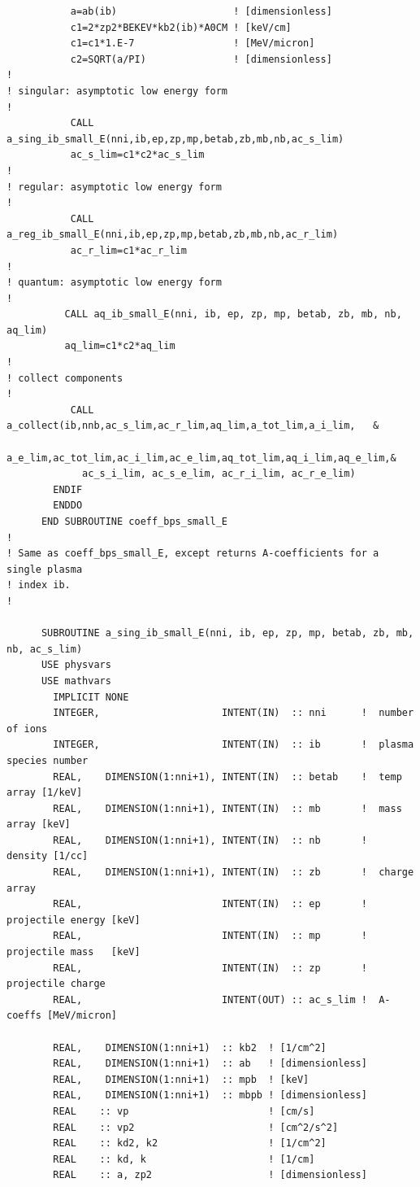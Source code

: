 \documentclass[preprint,12pt,eqsecnum,nofootinbib,amsmath,amssymb]{revtex4}
\begin{document}
{\begin{verbatim}
           a=ab(ib)                    ! [dimensionless] 
           c1=2*zp2*BEKEV*kb2(ib)*A0CM ! [keV/cm]
           c1=c1*1.E-7                 ! [MeV/micron]
           c2=SQRT(a/PI)               ! [dimensionless] 
!
! singular: asymptotic low energy form
!
           CALL a_sing_ib_small_E(nni,ib,ep,zp,mp,betab,zb,mb,nb,ac_s_lim)
           ac_s_lim=c1*c2*ac_s_lim
!
! regular: asymptotic low energy form
!
           CALL a_reg_ib_small_E(nni,ib,ep,zp,mp,betab,zb,mb,nb,ac_r_lim)
           ac_r_lim=c1*ac_r_lim
!
! quantum: asymptotic low energy form
!
          CALL aq_ib_small_E(nni, ib, ep, zp, mp, betab, zb, mb, nb, aq_lim)
          aq_lim=c1*c2*aq_lim
!
! collect components
!
           CALL a_collect(ib,nnb,ac_s_lim,ac_r_lim,aq_lim,a_tot_lim,a_i_lim,   &
             a_e_lim,ac_tot_lim,ac_i_lim,ac_e_lim,aq_tot_lim,aq_i_lim,aq_e_lim,&
             ac_s_i_lim, ac_s_e_lim, ac_r_i_lim, ac_r_e_lim)
        ENDIF
        ENDDO
      END SUBROUTINE coeff_bps_small_E
!
! Same as coeff_bps_small_E, except returns A-coefficients for a single plasma 
! index ib.
!

      SUBROUTINE a_sing_ib_small_E(nni, ib, ep, zp, mp, betab, zb, mb, nb, ac_s_lim)
      USE physvars
      USE mathvars      
        IMPLICIT NONE
        INTEGER,                     INTENT(IN)  :: nni      !  number of ions
        INTEGER,                     INTENT(IN)  :: ib       !  plasma species number
        REAL,    DIMENSION(1:nni+1), INTENT(IN)  :: betab    !  temp array [1/keV]
        REAL,    DIMENSION(1:nni+1), INTENT(IN)  :: mb       !  mass array [keV]
        REAL,    DIMENSION(1:nni+1), INTENT(IN)  :: nb       !  density [1/cc]
        REAL,    DIMENSION(1:nni+1), INTENT(IN)  :: zb       !  charge array
        REAL,                        INTENT(IN)  :: ep       !  projectile energy [keV]
        REAL,                        INTENT(IN)  :: mp       !  projectile mass   [keV]
        REAL,                        INTENT(IN)  :: zp       !  projectile charge
        REAL,                        INTENT(OUT) :: ac_s_lim !  A-coeffs [MeV/micron]

        REAL,    DIMENSION(1:nni+1)  :: kb2  ! [1/cm^2]
        REAL,    DIMENSION(1:nni+1)  :: ab   ! [dimensionless]
        REAL,    DIMENSION(1:nni+1)  :: mpb  ! [keV]
        REAL,    DIMENSION(1:nni+1)  :: mbpb ! [dimensionless]
        REAL    :: vp                        ! [cm/s]
        REAL    :: vp2                       ! [cm^2/s^2]
        REAL    :: kd2, k2                   ! [1/cm^2]
        REAL    :: kd, k                     ! [1/cm]
        REAL    :: a, zp2                    ! [dimensionless]


\end{verbatim}}
\end{document}

